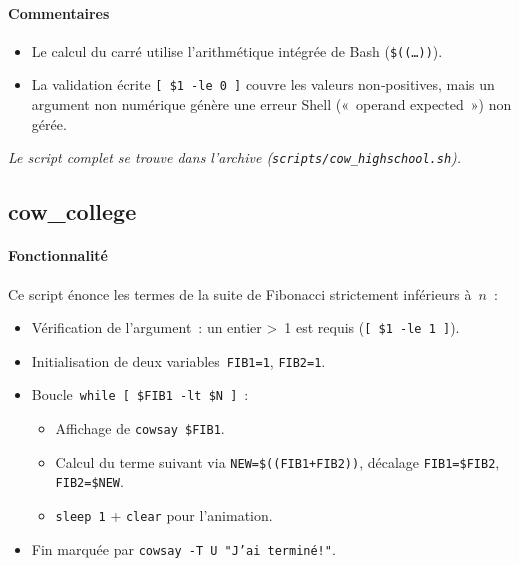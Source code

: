 \documentclass[a4paper,french,11pt]{article}
\begin{document}
\paragraph{Commentaires}  
\begin{itemize}
  \item Le calcul du carré utilise l’arithmétique intégrée de Bash (\texttt{\$((…))}).  
  \item La validation écrite \texttt{[ \$1 -le 0 ]} couvre les valeurs non‑positives, mais un argument non numérique génère une erreur Shell (« operand expected ») non gérée.  
\end{itemize}

\medskip
\noindent\emph{Le script complet se trouve dans l’archive (\texttt{scripts/cow\_highschool.sh}).}

\newpage

\newpage
\subsection{cow\_college}

\paragraph{Fonctionnalité}  
Ce script énonce les termes de la suite de Fibonacci strictement inférieurs à $n$ :
\begin{itemize}
  \item Vérification de l’argument : un entier > 1 est requis (\texttt{[ \$1 -le 1 ]}).  
  \item Initialisation de deux variables \texttt{FIB1=1}, \texttt{FIB2=1}.  
  \item Boucle \texttt{while [ \$FIB1 -lt \$N ]} :
    \begin{itemize}
      \item Affichage de \texttt{cowsay \$FIB1}.  
      \item Calcul du terme suivant via \texttt{NEW=\$((FIB1+FIB2))}, décalage \texttt{FIB1=\$FIB2}, \texttt{FIB2=\$NEW}.  
      \item \texttt{sleep 1} + \texttt{clear} pour l’animation.
    \end{itemize}
  \item Fin marquée par \texttt{cowsay -T U "J'ai terminé!"}.
\end{itemize}
\end{document}
